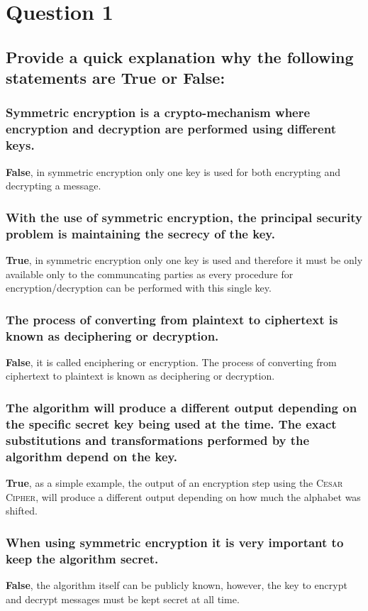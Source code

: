 \documentclass{report}
\begin{document}
	\section{Question 1}
	\startsection
		\renewcommand{\thesubsection}{\thesection.\Alph{subsection}}
		\subsection{Provide a quick explanation why the following statements are True or False:}
		\startsubsection
			\subsubsection{Symmetric encryption is a crypto-mechanism where encryption and decryption are performed using different keys.}
			\startsubsection
				\textbf{False}, in symmetric encryption only one key is used for both encrypting and decrypting a message.
			\closesection
			\subsubsection{With the use of symmetric encryption, the principal security problem is maintaining the secrecy of the key.}
			\startsubsection
				\textbf{True}, in symmetric encryption only one key is used and therefore it must be only available only to the communcating parties as every procedure for encryption/decryption can be performed with this single key.
			\closesection
			\subsubsection{The process of converting from plaintext to ciphertext is known as deciphering or decryption.}
			\startsubsection
				\textbf{False}, it is called enciphering or encryption. The process of converting from ciphertext to plaintext is known as deciphering or decryption.
			\closesection
			\subsubsection{The algorithm will produce a different output depending on the specific secret key being used at the time. The exact substitutions and transformations performed by the algorithm depend on the key.}
			\startsubsection
				\textbf{True}, as a simple example, the output of an encryption step using the \textsc{Cesar Cipher}, will produce a different output depending on how much the alphabet was shifted.
			\closesection
			\subsubsection{When using symmetric encryption it is very important to keep the algorithm secret.}
			\startsubsection
				\textbf{False}, the algorithm itself can be publicly known, however, the key to encrypt and decrypt messages must be kept secret at all time.
			\closesection
\end{document}
